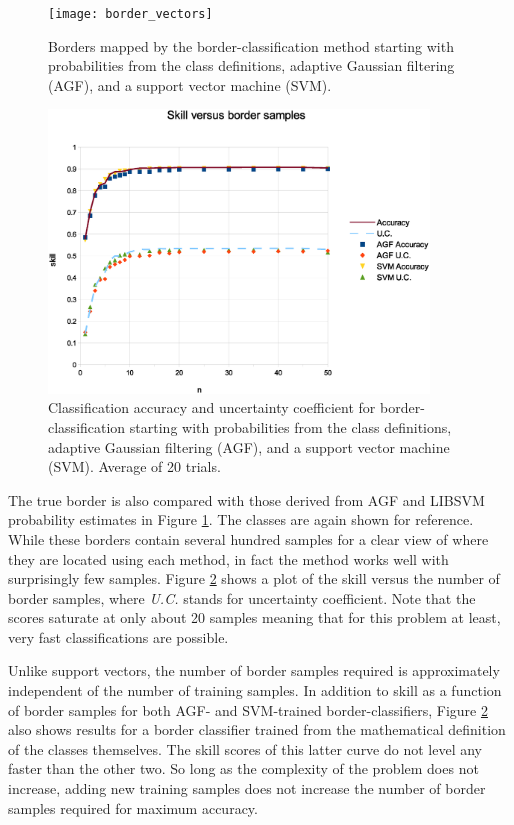 \documentclass[11pt]{article}
\begin{document}
\begin{figure}
\texttt{[image: border\_vectors]}
\caption{Borders mapped by the border-classification method starting with probabilities from the class definitions, adaptive Gaussian filtering (AGF), and a support vector machine (SVM).}
\label{border_vectors}
\end{figure}

\begin{figure}
\includegraphics[width=0.9\textwidth]{skill_v_nb}
\caption{Classification accuracy and uncertainty coefficient for border-classification starting with probabilities from the class definitions, adaptive Gaussian filtering (AGF), and a support vector machine (SVM). Average of 20 trials.}
\label{skill_v_nb}
\end{figure}

The true border is also compared with those derived from AGF and LIBSVM
probability estimates in Figure \ref{border_vectors}.
The classes are again shown for reference.
While these borders contain several hundred samples for a clear view of where
they are located using each method, in fact the method works well with
surprisingly few samples.  Figure \ref{skill_v_nb} shows a plot of the skill
versus the number of border samples, where {\it U.C.} stands for
uncertainty coefficient. Note that the scores saturate at only about 20
samples meaning that for this problem at least, very fast classifications are
possible.

Unlike support vectors, the number of border samples required is approximately
independent of the number of training samples.
In addition to skill as a function of border samples for both AGF- and 
SVM-trained border-classifiers, Figure \ref{skill_v_nb} also shows results
for a border classifier trained from the mathematical definition of the 
classes themselves. 
The skill scores of this latter curve do not level any faster than the 
other two.
So long as the complexity of
the problem does not increase, adding new training samples does not increase
the number of border samples required for maximum accuracy.
\end{document}

